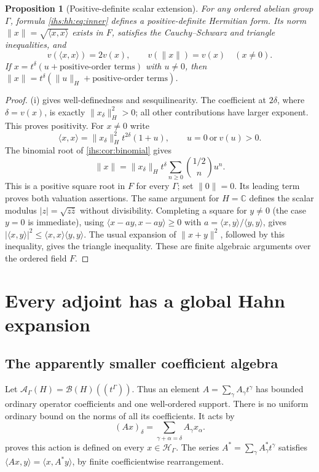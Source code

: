\documentclass[11pt,a4paper]{article}
\numberwithin{equation}{section}
\newtheorem{proposition}[proposition]{Proposition}
\theoremstyle{definition}
\theoremstyle{remark}
\newcommand{\C}{\mathbb C}
\newcommand{\Fld}{F}
\newcommand{\Hil}{\mathcal H_\Gamma}
\newcommand{\B}{\mathcal B(H)}
\newcommand{\Ahh}{\mathcal A_\Gamma(H)}
\newcommand{\abs}[1]{\lvert#1\rvert}
\newcommand{\norm}[1]{\lVert#1\rVert}
\newcommand{\ip}[2]{\langle#1,#2\rangle}
\begin{document}
\begin{proposition}[Positive-definite scalar extension]\label{ihs:hh:prop:inner}
For any ordered abelian group $\Gamma$, formula
\eqref{ihs:hh:eq:inner} defines a positive-definite Hermitian form.
Its norm $\norm{x}=\sqrt{\ip{x}{x}}$ exists in $\Fld$, satisfies the
Cauchy--Schwarz and triangle inequalities, and
\begin{equation}\label{ihs:hh:eq:normvaluation}
 v(\ip{x}{x})=2v(x),\qquad v(\norm{x})=v(x)\quad(x\ne0).
\end{equation}
If $x=t^\delta(u+\text{positive-order terms})$ with $u\ne0$, then
$\norm{x}=t^\delta(\norm{u}_H+\text{positive-order terms})$.
\end{proposition}
\begin{proof}
(i) gives well-definedness and sesquilinearity. The
coefficient at $2\delta$, where $\delta=v(x)$, is exactly
$\norm{x_\delta}_H^2>0$; all other contributions have larger exponent. This
proves positivity. For $x\ne0$ write
\[
 \ip{x}{x}=\norm{x_\delta}_H^2 t^{2\delta}(1+u),
 \qquad u=0\ \text{or}\ v(u)>0.
\]
The binomial root of \cref{ihs:cor:binomial} gives
\[
 \norm{x}=\norm{x_\delta}_H t^\delta
       \sum_{n\ge0}\binom{1/2}{n}u^n.
\]
This is a positive square root in $\Fld$ for every $\Gamma$; set
$\norm0=0$. Its leading term proves both valuation assertions.
The same argument for $H=\C$ defines the scalar modulus
$\abs z=\sqrt{z\bar z}$ without divisibility. Completing a square for
$y\ne0$ (the case $y=0$ is immediate), using
$\ip{x-ay}{x-ay}\ge0$ with $a=\ip{x}{y}/\ip{y}{y}$, gives
$\abs{\ip{x}{y}}^2\le\ip{x}{x}\ip{y}{y}$. The usual expansion of
$\norm{x+y}^2$, followed by this inequality, gives the triangle inequality.
These are finite algebraic arguments over the ordered field $\Fld$.
\end{proof}

\section{Every adjoint has a global Hahn expansion}\label{ihs:sec:adjoints}

\subsection{The apparently smaller coefficient algebra}\label{ihs:hh:sec:algebra}
Let $\Ahh=\B((t^\Gamma))$. Thus an element $A=\sum_\gamma A_\gamma t^\gamma$
has bounded ordinary operator coefficients and one well-ordered support.
There is no uniform ordinary bound on the norms of all its coefficients. It
acts by
\begin{equation}\label{ihs:hh:eq:operator-convolution}
 (Ax)_\delta=\sum_{\gamma+\alpha=\delta}A_\gamma x_\alpha.
\end{equation}
 proves this action is defined on every $x\in\Hil$.
The series $A^*=\sum_\gamma A_\gamma^*t^\gamma$ satisfies
$\ip{Ax}{y}=\ip{x}{A^*y}$, by finite coefficientwise rearrangement.
\end{document}
